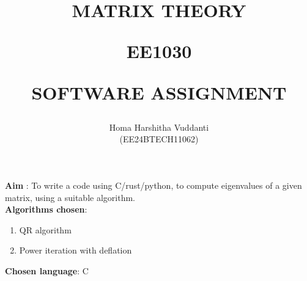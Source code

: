 \documentclass[journal]{IEEEtran}
\begin{document}


\title{
MATRIX THEORY

\large{EE1030}

SOFTWARE ASSIGNMENT
}
\author{Homa Harshitha Vuddanti

(EE24BTECH11062)
}	

\maketitle

\bigskip

\renewcommand{\thefigure}{\theenumi}
\renewcommand{\thetable}{\theenumi}
\textbf{Aim} : To write a code using C/rust/python, to compute eigenvalues of a given matrix, using a suitable algorithm.\\

\textbf{Algorithms chosen}: \begin{enumerate}
    \item QR algorithm
    \item Power iteration with deflation\\
\end{enumerate}

\textbf{Chosen language}: C\\
\end{document}
